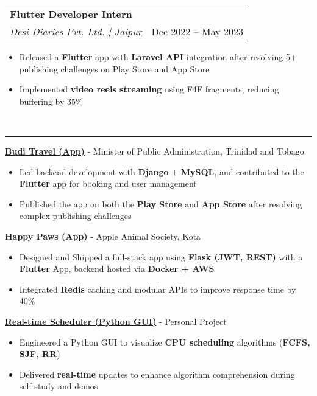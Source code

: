 \documentclass[a4paper,10.5pt]{article}
\makeatletter
\newcommand{\Section}[1]{\vspace{6pt}\noindent{\large\bfseries\MakeUppercase{#1}}\\\noindent\rule{\textwidth}{0.4pt}\vspace{6pt}}
\newcommand{\JobLine}[2]{\noindent\begin{tabular*}{\textwidth}{@{}l@{\extracolsep{\fill}}r@{}}#1 & #2\\\end{tabular*}}
\makeatother
\begin{document}
\vspace{2pt}
\JobLine{{\bfseries Flutter Developer Intern}\\\textit{\href{https://apps.apple.com/in/app/desi-dairies/id1642359792}{Desi Diaries Pvt. Ltd. | Jaipur}}}{Dec 2022 -- May 2023}
\begin{itemize}
  \item Released a {\bfseries Flutter} app with {\bfseries Laravel API} integration after resolving 5+ publishing challenges on Play Store and App Store
  \item Implemented {\bfseries video reels streaming} using F4F fragments, reducing buffering by 35\%
\end{itemize}

\Section{Projects}
\textbf{\href{https://apps.apple.com/in/app/budi-travel/id6464050697}{Budi Travel (App)}} - Minister of Public Administration, Trinidad and Tobago
\begin{itemize}
  \item Led backend development with {\bfseries Django} + {\bfseries MySQL}, and contributed to the {\bfseries Flutter} app for booking and user management 
  \item Published the app on both the {\bfseries Play Store} and {\bfseries App Store} after resolving complex publishing challenges
\end{itemize}
\vspace*{-0.1cm}
\textbf{Happy Paws (App)} - Apple Animal Society, Kota 
\begin{itemize}
  \item Designed and Shipped a full-stack app using {\bfseries Flask (JWT, REST)} with a {\bfseries Flutter} App, backend hosted via {\bfseries Docker + AWS}
  \item Integrated {\bfseries Redis} caching and modular APIs to improve response time by 40\%\\[4pt]
\end{itemize}
\vspace*{-0.7cm}
\textbf{\href{https://github.com/AnkushSinghGandhi/realtime_process_scheduler}{Real-time Scheduler (Python GUI)}} - Personal Project
\begin{itemize}
  \item Engineered a Python GUI to visualize {\bfseries CPU scheduling} algorithms ({\bfseries FCFS, SJF, RR})
  \item Delivered {\bfseries real-time} updates to enhance algorithm comprehension during self-study and demos\\[4pt]
\end{itemize}
\vspace*{-0.7cm}
\end{document}
